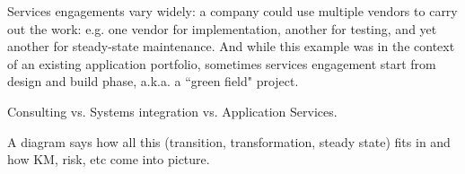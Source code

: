 Services engagements vary widely: a company could use multiple vendors to carry out the work: e.g. one vendor for implementation, another for testing, and yet another for steady-state maintenance.  And while this example was in the context of an existing application portfolio, sometimes services engagement start from design and build phase, a.k.a. a ``green field" project.

Consulting vs. Systems integration vs. Application Services.

%
%
%

A diagram says how all this (transition, transformation, steady state) fits in and how KM, risk, etc come into picture.

